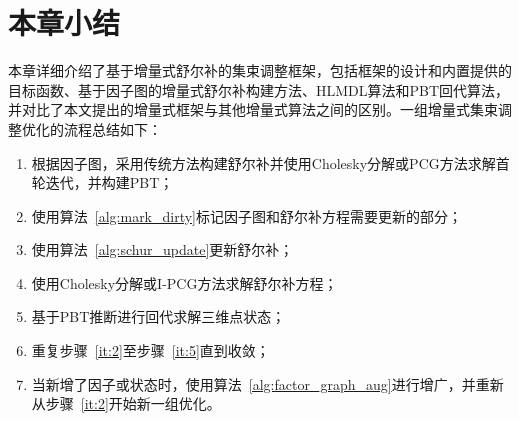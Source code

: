 \section{本章小结}

本章详细介绍了基于增量式舒尔补的集束调整框架，包括框架的设计和内置提供的目标函数、基于因子图的增量式舒尔补构建方法、HLMDL算法和PBT回代算法，并对比了本文提出的增量式框架与其他增量式算法之间的区别。一组增量式集束调整优化的流程总结如下：
\begin{enumerate}
    \item 根据因子图，采用传统方法构建舒尔补并使用Cholesky分解或PCG方法求解首轮迭代，并构建PBT；
    \item\label{it:2} 使用算法~\ref{alg:mark_dirty}标记因子图和舒尔补方程需要更新的部分；
    \item\label{it:3} 使用算法~\ref{alg:schur_update}更新舒尔补；
    \item\label{it:4} 使用Cholesky分解或I-PCG方法求解舒尔补方程；
    \item\label{it:5} 基于PBT推断进行回代求解三维点状态；
    \item 重复步骤~\ref{it:2}至步骤~\ref{it:5}直到收敛；
    \item 当新增了因子或状态时，使用算法~\ref{alg:factor_graph_aug}进行增广，并重新从步骤~\ref{it:2}开始新一组优化。
\end{enumerate}
